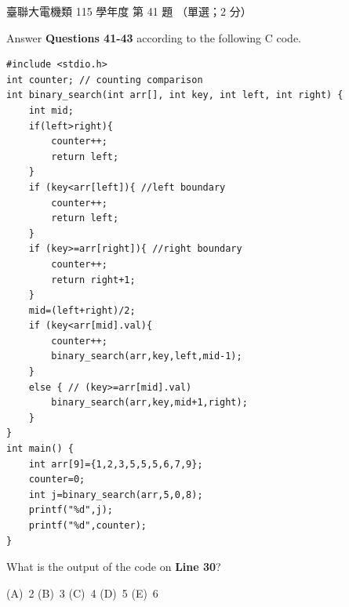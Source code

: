 \begin{pastexam}[label={px:ust-115-ee-ds-41}]{臺聯大電機類 115 學年度 第 41 題}
（單選；2 分）

Answer \textbf{Questions 41-43} according to the following C code.
\begin{verbatim}
#include <stdio.h>
int counter; // counting comparison
int binary_search(int arr[], int key, int left, int right) {
    int mid;
    if(left>right){
        counter++;
        return left;
    }
    if (key<arr[left]){ //left boundary
        counter++;
        return left;
    }
    if (key>=arr[right]){ //right boundary
        counter++;
        return right+1;
    }
    mid=(left+right)/2;
    if (key<arr[mid].val){
        counter++;
        binary_search(arr,key,left,mid-1);
    }
    else { // (key>=arr[mid].val)
        binary_search(arr,key,mid+1,right);
    }
}
int main() {
    int arr[9]={1,2,3,5,5,5,6,7,9};
    counter=0;
    int j=binary_search(arr,5,0,8);
    printf("%d",j);
    printf("%d",counter);
}
\end{verbatim}

What is the output of the code on \textbf{Line 30}?

(A)~2 \qquad (B)~3 \qquad (C)~4 \qquad (D)~5 \qquad (E)~6
\end{pastexam}

